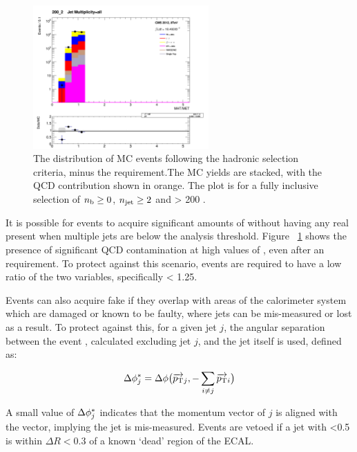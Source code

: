 \begin{figure}[ht!]
\centering
\includegraphics[width=0.6\textwidth]{Figs/datamc/had/Stacked_MHTovMET_all_200_upwards.png}
\caption{The \mhtmet distribution of MC events following the hadronic selection
criteria, minus the \mhtmet requirement.The MC yields are stacked,
with the QCD contribution shown in orange. The plot is for a fully inclusive
selection of $n_{\text{b}} \geq 0$, $n_{\text{jet}} \geq 2$ and \HT > 200 \gev.}
\label{fig:full_mhtmet_distro}
\end{figure}


It is possible for events to acquire significant amounts of \mht without having any
real \met present when multiple jets are below the analysis threshold. Figure
~\ref{fig:full_mhtmet_distro} shows the presence of significant QCD contamination
at high values of \mhtmet, even after an \alphat requirement. To protect against
this scenario, events are required to have a low ratio of the two variables,
specifically \mhtmet < 1.25.

Events can also acquire fake \mht if they overlap with areas of the calorimeter 
system which are damaged or known to be faulty, where jets can be mis-measured or 
lost as a result. To protect against this, for a given jet $j$, the angular separation
between the event \mht, calculated excluding jet $j$, and the jet itself is used, defined
as:

\begin{equation}
\Delta \phi^*_j = \Delta \phi\big(\overrightarrow{{p_{\text T}}}_j,-\sum_{i\neq j}{\overrightarrow{{p_{\text T}}}_i}\big)
\label{eq:biasdphi}
\end{equation}

A small value of $\Delta \phi^*_j$ indicates that the momentum vector of $j$
is aligned with the \mht vector, implying the jet is mis-measured. Events are 
vetoed if a jet with \dphistar<0.5 is within $\Delta R < 0.3$ of a known
`dead' region of the ECAL.

